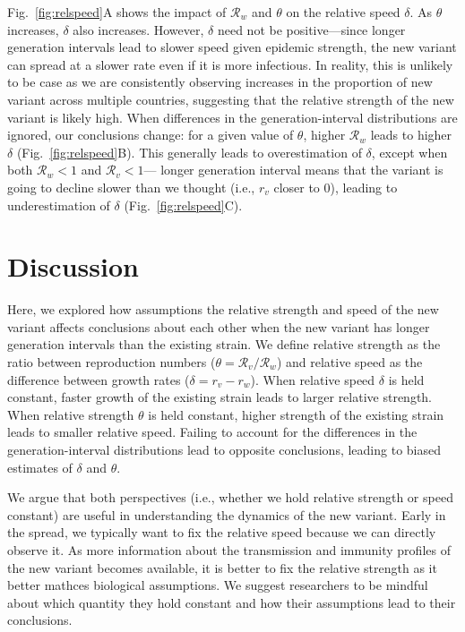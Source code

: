 \documentclass[12pt]{article}
\newcommand{\fref}[1]{Fig.~\ref{fig:#1}}
\newcommand{\RR}{\ensuremath{{\mathcal R}}\xspace}
\begin{document}
\fref{relspeed}A shows the impact of $\RR_w$ and $\theta$ on the relative speed $\delta$.
As $\theta$ increases, $\delta$ also increases.
However, $\delta$ need not be positive---since longer generation intervals lead to slower speed given epidemic strength, the new variant can spread at a slower rate even if it is more infectious.
In reality, this is unlikely to be case as we are consistently observing increases in the proportion of new variant across multiple countries, suggesting that the relative strength of the new variant is likely high.
When differences in the generation-interval distributions are ignored, our conclusions change: for a given value of $\theta$, higher $\RR_w$ leads to higher $\delta$ (\fref{relspeed}B).
This generally leads to overestimation of $\delta$, except when both $\RR_w < 1$ and $\RR_v < 1$---
longer generation interval means that the variant is going to decline slower than we thought (i.e., $r_v$ closer to 0), leading to underestimation of $\delta$ (\fref{relspeed}C).

\section{Discussion}

Here, we explored how assumptions the relative strength and speed of the new variant affects conclusions about each other when the new variant has longer generation intervals than the existing strain.
We define relative strength as the ratio between reproduction numbers ($\theta=\RR_v/\RR_w$) and relative speed as the difference between growth rates ($\delta=r_v-r_w$).
When relative speed $\delta$ is held constant, faster growth of the existing strain leads to larger relative strength.
When relative strength $\theta$ is held constant, higher strength of the existing strain leads to smaller relative speed.
Failing to account for the differences in the generation-interval distributions lead to opposite conclusions, leading to biased estimates of $\delta$ and $\theta$.

We argue that both perspectives (i.e., whether we hold relative strength or speed constant) are useful in understanding the dynamics of the new variant.
Early in the spread, we typically want to fix the relative speed because we can directly observe it.
As more information about the transmission and immunity profiles of the new variant becomes available, it is better to fix the relative strength as it better mathces biological assumptions.
We suggest researchers to be mindful about which quantity they hold constant and how their assumptions lead to their conclusions.
\end{document}
